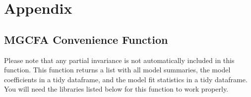 \documentclass[
  man]{apa7}
\begin{document}
\newpage

\hypertarget{appendix}{%
\section{Appendix}\label{appendix}}

\hypertarget{mgcfa-convenience-function}{%
\subsection{MGCFA Convenience Function}\label{mgcfa-convenience-function}}

Please note that any partial invariance is not automatically included in this function. This function returns a list with all model summaries, the model coefficients in a tidy dataframe, and the model fit statistics in a tidy dataframe. You will need the libraries listed below for this function to work properly.

\small
\end{document}
